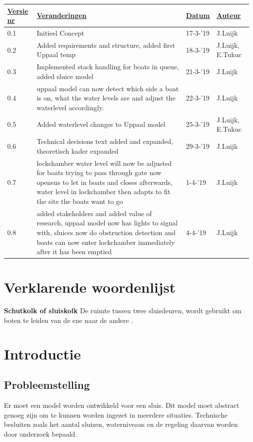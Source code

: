 \documentclass{article}
\begin{document}
\begin{table}[htp]
\begin{tabular}{|l|p{2.5in}|l|l|}
\hline
\rowcolor[HTML]{FFD700} 
{\ul \textbf{Versie nr}} & {\ul \textbf{Veranderingen}} & {\ul \textbf{Datum}} & {\ul \textbf{Auteur}} \\
\hline
0.1 & Initieel Concept & 17-3-'19 & J.Luijk \\    
\hline
0.2 &  Added requirements and structure, added first Uppaal temp & 18-3-'19 & J.Luijk, E.Tukuc \\ 
\hline
0.3 &  Implemented stack handling for boats in queue, added sluice model& 21-3-'19 & J.Luijk\\ 
\hline
0.4 & uppaal model can now detect which side a boat is on, what the water levels are and adjust the waterlevel accordingly. & 22-3-'19 & J.Luijk\\ 
\hline
0.5 & Added waterlevel changes to Uppaal model & 25-3-'19 & J.Luijk, E.Tukuc\\ 
\hline
0.6 & Technical decisions text added and expanded, theoretisch kader expanded  & 29-3-'19 &  J.Luijk\\ 
\hline
0.7 & lockchamber water level will now be adjusted for boats trying to pass through gate now openens to let in boats and closes afterwards, water level in lockchamber then adapts to fit the site the boats want to go & 1-4-'19 & J.Luijk  \\ 
\hline
0.8 & added stakeholders and added value of research, uppaal model now has lights to signal with, sluices now do obstruction detection and boats can now enter lockchamber immediately after it has been emptied& 4-4-'19 & J.Luijk \\ 
\hline
\end{tabular}
\end{table}
\newpage

\section{Verklarende woordenlijst}
\textbf{Schutkolk of sluiskolk} \newline
De ruimte tussen twee sluisdeuren, wordt gebruikt om boten te leiden van de ene naar de andere \cite{definitionschutkolk}.
\newpage
\section{Introductie}
\subsection{Probleemstelling}
Er moet een model worden ontwikkeld voor een sluis. Dit model moet abstract genoeg zijn om te kunnen worden ingezet in meerdere situaties. Technische besluiten zoals het aantal sluizen, waterniveaus en de regeling daarvan worden door onderzoek bepaald.
\end{document}
